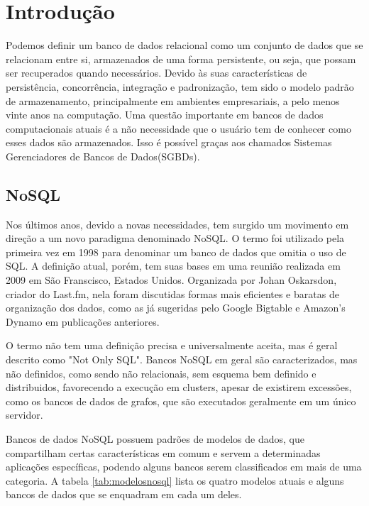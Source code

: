 \chapter{Introdução}

Podemos definir um banco de dados relacional como um conjunto de dados que se relacionam entre si, armazenados de uma forma persistente, ou seja, que possam ser recuperados quando necessários. Devido às suas características de persistência, concorrência, integração e padronização, tem sido o modelo padrão de armazenamento, principalmente em ambientes empresariais, a pelo menos vinte anos na computação\cite{pramod}. Uma questão importante em bancos de dados computacionais atuais é a não necessidade que o usuário tem de conhecer como esses dados são armazenados. Isso é possível graças aos chamados Sistemas Gerenciadores de Bancos de Dados(SGBDs)\cite{jan}.

\section{NoSQL}
Nos últimos anos, devido a novas necessidades, tem surgido um movimento em direção a um novo paradigma denominado NoSQL. O termo foi utilizado pela primeira vez em 1998 para denominar um banco de dados que omitia o uso de SQL. A definição atual, porém, tem suas bases em uma reunião realizada em 2009 em São Franscisco, Estados Unidos. Organizada por Johan Oskarsdon, criador do Last.fm, nela foram discutidas formas mais eficientes e baratas de organização dos dados, como as já sugeridas pelo Google Bigtable e Amazon's Dynamo em publicações anteriores\cite{chrisnosql}.

O termo não tem uma definição precisa e universalmente aceita, mas é geral descrito como "Not Only SQL". Bancos NoSQL em geral são caracterizados, mas não definidos, como sendo não relacionais, sem esquema bem definido e distribuidos, favorecendo a execução em clusters, apesar de existirem excessões, como os bancos de dados de grafos, que são executados geralmente em um único servidor.

Bancos de dados NoSQL possuem padrões de modelos de dados, que compartilham certas características em comum e servem a determinadas aplicações específicas, podendo alguns bancos serem classificados em mais de uma categoria. A tabela \ref{tab:modelosnosql} lista os quatro modelos atuais e alguns bancos de dados que se enquadram em cada um deles.

